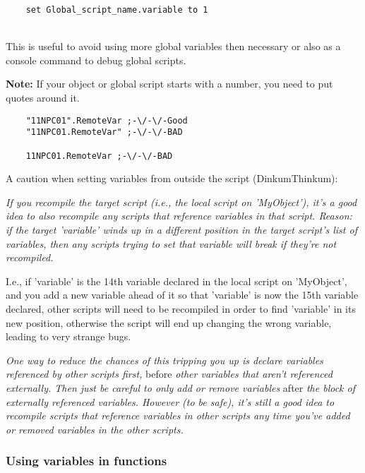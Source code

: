 \begin{lstlisting}
	set Global_script_name.variable to 1
\end{lstlisting}

\strut \\
This is useful to avoid using more global variables then necessary or
also as a console command to debug global scripts.

\textbf{Note:} If your object or global script starts with a number, you
need to put quotes around it.

\begin{lstlisting}
	"11NPC01".RemoteVar ;-\/-\/-Good
	"11NPC01.RemoteVar" ;-\/-\/-BAD
	
	11NPC01.RemoteVar ;-\/-\/-BAD
\end{lstlisting}

A caution when setting variables from outside the script
(DinkumThinkum):

\emph{If you recompile the target script (i.e., the local script on
'MyObject'), it's a good idea to also recompile any scripts that
reference variables in that script. Reason: if the target 'variable'
winds up in a different position in the target script's list of
variables, then any scripts trying to set that variable will break if
they're not recompiled.}

I.e., if 'variable' is the 14th variable declared in the local script on
'MyObject', and you add a new variable ahead of it so that 'variable' is
now the 15th variable declared, other scripts will need to be recompiled
in order to find 'variable' in its new position, otherwise the script
will end up changing the wrong variable, leading to very strange bugs.

\emph{One way to reduce the chances of this tripping you up is declare
variables referenced by other scripts first,} before \emph{other
variables that aren't referenced externally. Then just be careful to
only add or remove variables} after \emph{the block of externally
referenced variables. However (to be safe), it's still a good idea to
recompile scripts that reference variables in other scripts any time
you've added or removed variables in the other scripts.}

\hypertarget{using-variables-in-functions}{%
\subsubsection{Using variables in
functions}\label{using-variables-in-functions}}

